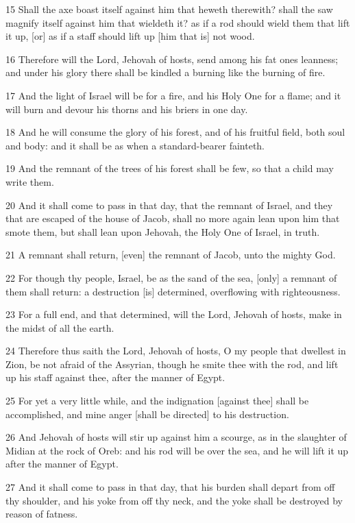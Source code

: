\par 15 Shall the axe boast itself against him that heweth therewith? shall the saw magnify itself against him that wieldeth it? as if a rod should wield them that lift it up, [or] as if a staff should lift up [him that is] not wood.
\par 16 Therefore will the Lord, Jehovah of hosts, send among his fat ones leanness; and under his glory there shall be kindled a burning like the burning of fire.
\par 17 And the light of Israel will be for a fire, and his Holy One for a flame; and it will burn and devour his thorns and his briers in one day.
\par 18 And he will consume the glory of his forest, and of his fruitful field, both soul and body: and it shall be as when a standard-bearer fainteth.
\par 19 And the remnant of the trees of his forest shall be few, so that a child may write them.
\par 20 And it shall come to pass in that day, that the remnant of Israel, and they that are escaped of the house of Jacob, shall no more again lean upon him that smote them, but shall lean upon Jehovah, the Holy One of Israel, in truth.
\par 21 A remnant shall return, [even] the remnant of Jacob, unto the mighty God.
\par 22 For though thy people, Israel, be as the sand of the sea, [only] a remnant of them shall return: a destruction [is] determined, overflowing with righteousness.
\par 23 For a full end, and that determined, will the Lord, Jehovah of hosts, make in the midst of all the earth.
\par 24 Therefore thus saith the Lord, Jehovah of hosts, O my people that dwellest in Zion, be not afraid of the Assyrian, though he smite thee with the rod, and lift up his staff against thee, after the manner of Egypt.
\par 25 For yet a very little while, and the indignation [against thee] shall be accomplished, and mine anger [shall be directed] to his destruction.
\par 26 And Jehovah of hosts will stir up against him a scourge, as in the slaughter of Midian at the rock of Oreb: and his rod will be over the sea, and he will lift it up after the manner of Egypt.
\par 27 And it shall come to pass in that day, that his burden shall depart from off thy shoulder, and his yoke from off thy neck, and the yoke shall be destroyed by reason of fatness.
